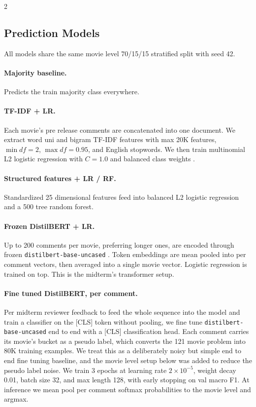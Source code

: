 \documentclass[10pt,letterpaper]{article}
\begin{document}
\begin{multicols}{2}
\subsection{Prediction Models}
\noindent All models share the same movie level 70/15/15 stratified split with seed 42.

\paragraph{Majority baseline.} Predicts the train majority class everywhere.

\paragraph{TF-IDF + LR.} Each movie's pre release comments are concatenated into one document. We extract word uni and bigram TF-IDF features with max 20K features, $\min\!\textit{df}{=}2$, $\max\!\textit{df}{=}0.95$, and English stopwords. We then train multinomial L2 logistic regression with $C{=}1.0$ and balanced class weights \cite{pedregosa2011}.

\paragraph{Structured features + LR / RF.} Standardized 25 dimensional features feed into balanced L2 logistic regression and a 500 tree random forest.

\paragraph{Frozen DistilBERT + LR.} Up to 200 comments per movie, preferring longer ones, are encoded through frozen \texttt{distilbert-base-uncased} \cite{sanh2019,wolf2020}. Token embeddings are mean pooled into per comment vectors, then averaged into a single movie vector. Logistic regression is trained on top. This is the midterm's transformer setup.

\paragraph{Fine tuned DistilBERT, per comment.} Per midterm reviewer feedback to feed the whole sequence into the model and train a classifier on the [CLS] token without pooling, we fine tune \texttt{distilbert-base-uncased} end to end with a [CLS] classification head. Each comment carries its movie's bucket as a pseudo label, which converts the 121 movie problem into 80K training examples. We treat this as a deliberately noisy but simple end to end fine tuning baseline, and the movie level setup below was added to reduce the pseudo label noise. We train 3 epochs at learning rate $2{\times}10^{-5}$, weight decay 0.01, batch size 32, and max length 128, with early stopping on val macro F1. At inference we mean pool per comment softmax probabilities to the movie level and argmax.


\end{multicols}
\end{document}

